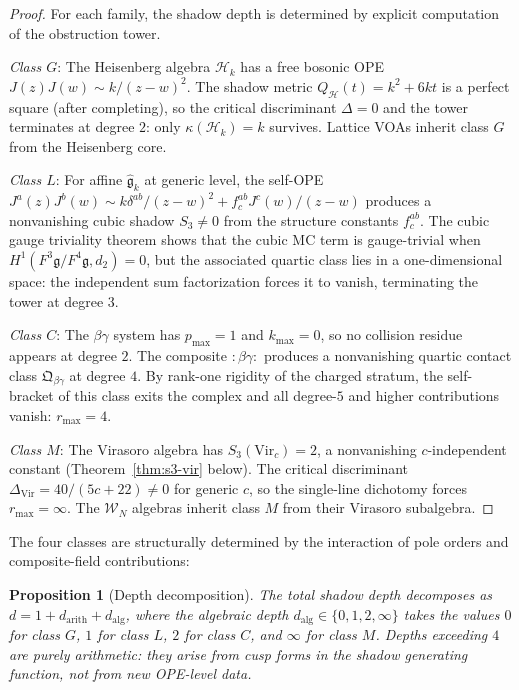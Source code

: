 \documentclass[11pt]{article}
\newtheorem{proposition}[theorem]{Proposition}
\theoremstyle{definition}
\theoremstyle{remark}
\newcommand{\fg}{\mathfrak{g}}
\newcommand{\Walg}{\mathcal{W}}
\newcommand{\Vir}{\mathrm{Vir}}
\numberwithin{equation}{section}
\begin{document}
\begin{proof}
For each family, the shadow depth is determined by explicit computation
of the obstruction tower.

\emph{Class $G$}: The Heisenberg algebra $\mathcal{H}_k$ has a free
bosonic OPE $J(z)J(w) \sim k/(z-w)^2$. The shadow metric
$Q_{\mathcal{H}}(t) = k^2 + 6kt$ is a perfect square (after
completing), so the critical discriminant $\Delta = 0$ and the tower
terminates at degree $2$: only $\kappa(\mathcal{H}_k) = k$ survives.
Lattice VOAs inherit class $G$ from the Heisenberg core.

\emph{Class $L$}: For affine $\widehat{\fg}_k$ at generic level, the
self-OPE $J^a(z)J^b(w) \sim k\delta^{ab}/(z-w)^2 + f^{ab}_c J^c(w)/(z-w)$
produces a nonvanishing cubic shadow $S_3 \neq 0$ from the structure
constants $f^{ab}_c$. The cubic gauge triviality theorem shows that the
cubic MC term is gauge-trivial when $H^1(F^3\fg/F^4\fg, d_2) = 0$, but
the associated quartic class lies in a one-dimensional space: the
independent sum factorization forces it to vanish, terminating the tower
at degree $3$.

\emph{Class $C$}: The $\beta\gamma$ system has $p_{\max} = 1$ and
$k_{\max} = 0$, so no collision residue appears at degree $2$. The
composite $:\!\beta\gamma\!:$ produces a nonvanishing quartic contact
class $\mathfrak{Q}_{\beta\gamma}$ at degree $4$. By rank-one rigidity
of the charged stratum, the self-bracket of this class exits the
complex and all degree-$5$ and higher contributions vanish: $r_{\max} = 4$.

\emph{Class $M$}: The Virasoro algebra has $S_3(\Vir_c) = 2$,
a nonvanishing $c$-independent constant (Theorem~\ref{thm:s3-vir}
below). The critical discriminant $\Delta_{\Vir} = 40/(5c+22) \neq 0$
for generic $c$, so the single-line dichotomy forces
$r_{\max} = \infty$. The $\Walg_N$ algebras inherit class $M$ from
their Virasoro subalgebra.
\end{proof}

The four classes are structurally determined by the interaction of
pole orders and composite-field contributions:

\begin{proposition}[Depth decomposition]\label{prop:depth-decomp}
The total shadow depth decomposes as
$d = 1 + d_{\mathrm{arith}} + d_{\mathrm{alg}}$,
where the algebraic depth $d_{\mathrm{alg}} \in \{0, 1, 2, \infty\}$
takes the values $0$ for class $G$, $1$ for class $L$, $2$ for
class $C$, and $\infty$ for class $M$. Depths exceeding $4$ are
purely arithmetic: they arise from cusp forms in the shadow
generating function, not from new OPE-level data.
\end{proposition}
\end{document}
